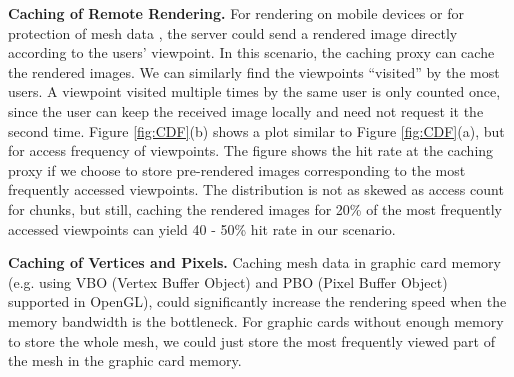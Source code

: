 \textbf{Caching of Remote Rendering.}
For rendering on mobile devices \cite{bao06remote} or for 
protection of mesh data \cite{koller04scanview}, 
the server could send a rendered image directly according to the users' viewpoint.
In this
scenario, the caching proxy can cache the rendered images.  We can
similarly find the viewpoints ``visited'' by the most users.  A
viewpoint visited multiple times by the same user is only counted
once, since the user can keep the received image locally and need not
request it the second time.  Figure \ref{fig:CDF}(b) shows a plot
similar to Figure \ref{fig:CDF}(a), but for access frequency of 
viewpoints.  The figure shows the hit rate at the caching proxy 
if we choose to store pre-rendered images corresponding to the
most frequently accessed viewpoints.
The distribution is not as skewed as access count for chunks, 
but still, caching the rendered images for 20\% of the most 
frequently accessed viewpoints can yield 40 - 50\% hit rate
in our scenario.

\textbf{Caching of Vertices and Pixels.}
Caching mesh data in graphic card memory 
(e.g. using VBO (Vertex Buffer Object) and PBO (Pixel Buffer Object) supported in OpenGL), 
could significantly increase the rendering speed when the memory bandwidth is the bottleneck.
For graphic cards without enough memory to store the whole mesh, we could just store the most frequently viewed part of the mesh
in the graphic card memory. 

